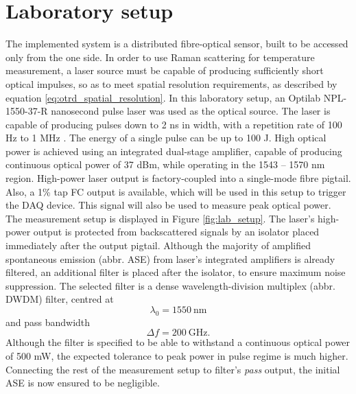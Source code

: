\documentclass{standalone}
\begin{document}
\chapter{Laboratory setup} \label{ch:setup}
\setcounter{page}\thestranica


The implemented system is a distributed fibre-optical sensor, built to be accessed only from the one side. In order to use Raman scattering for temperature measurement, a laser source must be capable of producing sufficiently short optical impulses, so as to meet spatial resolution requirements, as described by equation \ref{eq:otrd_spatial_resolution}. In this laboratory setup, an Optilab NPL-1550-37-R nanosecond pulse laser was used as the optical source. The laser is capable of producing pulses down to 2 ns in width, with a repetition rate of 100 Hz to 1 MHz \cite{datasheet:laser}. The energy of a single pulse can be up to 100 \textmu J. High optical power is achieved using an integrated dual-stage amplifier, capable of producing continuous optical power of 37 dBm, while operating in the 1543 -- 1570 nm region. High-power laser output is factory-coupled into a single-mode fibre pigtail. Also, a 1\% tap FC output is available, which will be used in this setup to trigger the DAQ device. This signal will also be used to measure peak optical power. \\

The measurement setup is displayed in Figure \ref{fig:lab_setup}.
The laser's high-power output is protected from backscattered signals by an isolator placed immediately after the output pigtail. Although the majority of amplified spontaneous emission (abbr. ASE) from laser's integrated amplifiers is already filtered, an additional filter is placed after the isolator, to ensure maximum noise suppression. The selected filter is a dense wavelength-division multiplex (abbr. DWDM) filter, centred at \cite{datasheet:dwdm_filter}
\begin{equation} \label{eq:dwdm_filter_centre}
\lambda_0 = \SI{1550}{\nano \meter}
\end{equation} and pass bandwidth 
\begin{equation} \label{eq:dwdm_filter_bw}
\varDelta f = \SI{200}{\giga \hertz} \textrm{.}
\end{equation}
Although the filter is specified to be able to withstand a continuous optical power of 500 mW, the expected tolerance to peak power in pulse regime is much higher. Connecting the rest of the measurement setup to filter's \textit{pass} output, the initial ASE is now ensured to be negligible. \\
\end{document}
